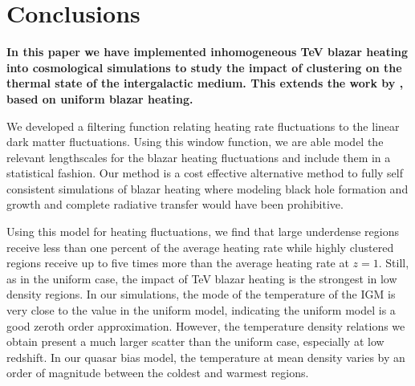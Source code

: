 \documentclass[twocolumns]{emulateapj}
\newcommand\ALc[1]{{\color{red} \bf #1}} %
\begin{document}
\section{Conclusions}
\ALc{In this paper we  have implemented inhomogeneous TeV blazar heating into cosmological simulations to study the impact of clustering on the thermal state of the intergalactic medium. This extends the work by  \citet{2012ApJ...752...23C,2012MNRAS.423..149P}, based on uniform blazar heating.

We developed a filtering function relating heating rate fluctuations to the linear dark matter fluctuations. Using this window function, we are able model the relevant lengthscales for the blazar heating fluctuations and include them in a statistical fashion. Our method is a cost effective alternative method to fully self consistent simulations of blazar heating where modeling black hole formation and growth and complete radiative transfer would have been prohibitive. 




Using this model for heating fluctuations, we find that large underdense regions receive less than one percent of the average heating rate while highly clustered regions receive up to five times more than the average heating rate at $z=1$. Still, as in the uniform case, the impact of TeV blazar heating is the strongest in low density regions. In our simulations, the mode of the temperature of the IGM is very close to the value in the uniform model, indicating the uniform model is a good zeroth order approximation. However, the temperature density relations we obtain present a much larger scatter than the uniform case, especially at low redshift. In our quasar bias model, the temperature at mean density varies by an order of magnitude between the coldest and warmest regions. 

}
\end{document}
